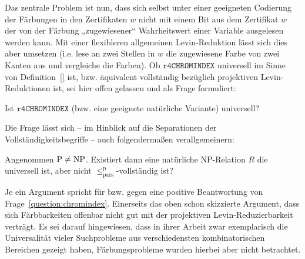 Das zentrale Problem ist nun, dass sich selbst unter einer geeigneten Codierung der Färbungen in den Zertifikaten $w$ nicht mit einem Bit aus dem Zertifikat $w$ der von der Färbung „zugewiesener“ Wahrheitswert einer Variable ausgelesen werden kann. Mit einer flexibleren allgemeinen Levin-Reduktion lässt sich dies aber umsetzen (i.e. lese an zwei Stellen in $w$ die zugewiesene Farbe von zwei Kanten aus und vergleiche die Farben). Ob $\mathtt{r4CHROMINDEX}$ universell im Sinne von Definition~\ref{} ist, bzw. äquivalent vollständig bezüglich projektiven Levin-Reduktionen ist, sei hier offen gelassen und als Frage formuliert:
\begin{question}\label{question:chromindex}
    Ist $\mathtt{r4CHROMINDEX}$ (bzw. eine geeignete natürliche Variante) universell?
\end{question}
Die Frage lässt sich -- im Hinblick auf die Separationen der Vollständigkeitsbegriffe -- auch  folgendermaßen verallgemeinern:
\begin{question}
    Angenommen $\mathrm{P}\neq\mathrm{NP}$.
    Existiert dann eine natürliche NP-Relation $R$ die universell ist, aber nicht $\leq_\mathrm{pars}^\mathrm p$-vollständig ist?
\end{question}

Je ein Argument spricht für bzw. gegen eine positive Beantwortung von Frage~\ref{question:chromindex}.
Einerseits das oben schon skizzierte Argument, dass sich Färbbarkeiten offenbar nicht gut mit der projektiven Levin-Reduzierbarkeit verträgt.  Es sei darauf hingewiesen, dass \textcite{agrawal_universal_1992} in ihrer Arbeit zwar exemplarisch die Universalität vieler Suchprobleme aus verschiedensten kombinatorischen Bereichen gezeigt haben, Färbungsprobleme wurden hierbei aber nicht betrachtet. 

